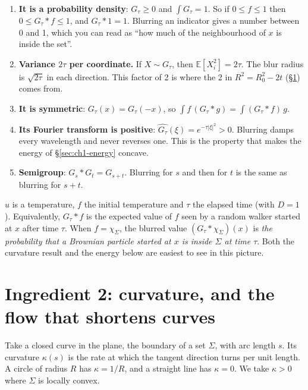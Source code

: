 \begin{enumerate}[nosep]
  \item \textbf{It is a probability density}: $G_\tau \ge 0$ and $\int G_\tau = 1$.
        So if $0 \le f \le 1$ then $0 \le G_\tau * f \le 1$, and
        $G_\tau * 1 = 1$. Blurring an indicator gives a number between 0 and 1,
        which you can read as ``how much of the neighbourhood of $x$ is
        inside the set''.
  \item \textbf{Variance $2\tau$ per coordinate.} If $X \sim G_\tau$, then
        $\mathbb E[X_i^2] = 2\tau$. The blur radius is $\sqrt{2\tau}$ in each
        direction. This factor of 2 is where the 2 in $R^2 = R_0^2 - 2t$
        (\S\ref{sec:ch1-curvature}) comes from.
  \item \textbf{It is symmetric}: $G_\tau(x) = G_\tau(-x)$, so
        $\int f\, (G_\tau * g) = \int (G_\tau * f)\, g$.
  \item \textbf{Its Fourier transform is positive}:
        $\widehat{G_\tau}(\xi) = e^{-\tau|\xi|^2} > 0$. Blurring damps every
        wavelength and never reverses one. This is the property that makes
        the energy of \S\ref{sec:ch1-energy} concave.
  \item \textbf{Semigroup}: $G_s * G_t = G_{s+t}$. Blurring for $s$ and then
        for $t$ is the same as blurring for $s + t$.
\end{enumerate}

\begin{physics}
$u$ is a temperature, $f$ the initial temperature and $\tau$ the elapsed time
(with $D = 1$). Equivalently, $G_\tau * f$ is the expected value of $f$ seen by a
random walker started at $x$ after time $\tau$. When $f = \chi_\Sigma$, the
blurred value $(G_\tau * \chi_\Sigma)(x)$ is \emph{the probability that a
Brownian particle started at $x$ is inside $\Sigma$ at time $\tau$}. Both the
curvature result and the energy below are easiest to see in this picture.
\end{physics}

\section{Ingredient 2: curvature, and the flow that shortens curves}
\label{sec:ch1-curvature}

Take a closed curve in the plane, the boundary of a set $\Sigma$, with arc
length $s$. Its curvature $\kappa(s)$ is the rate at which the tangent direction
turns per unit length. A circle of radius $R$ has $\kappa = 1/R$, and a straight
line has $\kappa = 0$. We take $\kappa > 0$ where $\Sigma$ is locally convex.

